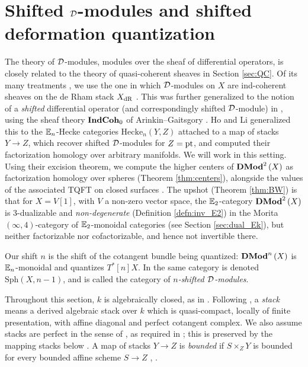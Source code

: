 \section{Shifted \texorpdfstring{$\mathcal{D}$}{D}-modules and shifted deformation quantization}
\label{sec:dmod}

The theory of $\mathcal{D}$-modules, modules over the sheaf of differential operators, is closely
related to the theory of quasi-coherent sheaves in Section \ref{sec:QC}. Of its many treatments
\cite{HTT, GR:v2}, we use the one in which $\mathcal{D}$-modules on $X$ are ind-coherent sheaves on the
de Rham stack $X_{\text{dR}}$ \cite{GR:v2}.
This was further generalized to the notion of a \emph{shifted} differential operator (and
correspondingly shifted $\mathcal{D}$-module) in
\cite{Ber:Sph,Ber:center}, using the sheaf theory $\mathbf{IndCoh}_0$ of Arinkin--Gaitsgory
\cite{AG:crystal}.
Ho and Li \cite{HoLi} generalized this to the $\mathbb{E}_n$-Hecke categories
$\mathrm{Hecke}_n\left(Y,Z\right)$ attached to a map of stacks $Y\to Z$, which recover
shifted $\mathcal{D}$-modules for $Z=\text{pt}$, and computed their factorization homology over
arbitrary manifolds.
We will work in this setting.
Using their excision theorem, we compute the higher centers of $\mathbf{DMod}^2\left(X\right)$ as
factorization homology over spheres (Theorem \ref{thm:centers}), alongside the values of
the associated TQFT on closed surfaces \cite{Ber:Sph,HoLi}.
The upshot (Theorem \ref{thm:BW}) is that for $X = V\left[1\right]$, with $V$ a non-zero vector
space, the $\mathbb{E}_2$-category $\mathbf{DMod}^2\left(X\right)$ is $3$-dualizable and \emph{non-degenerate}
(Definition \ref{defn:inv_E2}) in the Morita $\left(\infty , 4\right)$-category of
$\mathbb{E}_2$-monoidal categories (see Section \ref{sec:dual_Ek}), but neither factorizable nor
cofactorizable, and hence not invertible there.

\begin{rmk}[Indexing]
\label{rmk:indexing}
Our shift $n$ is the shift of the cotangent bundle being quantized: $\mathbf{DMod}^n\left(X\right)$
is $\mathbb{E}_n$-monoidal and quantizes $T^*\left[n\right]X$.
In \cite{Ber:Sph} the same category is denoted
$\mathrm{Sph}\left(X , n-1\right)$, and is called the category of
\emph{$n$-shifted $\mathcal{D}$-modules}.
\end{rmk}

Throughout this section, $k$ is algebraically closed, as in \cite{Ber:ShvCatH}. Following
\cite[Section 2]{Ber:Sph}, a \emph{stack} means a
derived algebraic stack over $k$ which is quasi-compact, locally
of finite presentation, with affine diagonal and perfect cotangent complex.
We also assume stacks are perfect in the sense of \cite{BZFN}, as required in \cite{HoLi};
this is preserved by the mapping stacks below \cite[Remark 3.1.1]{HoLi}.
A map of stacks $Y\to Z$ is \emph{bounded} if $S\times_Z Y$ is bounded for every bounded
affine scheme $S\to Z$ \cite[Section 2.1.5]{Ber:center}, \cite[Section 2.2.3]{HoLi}.

